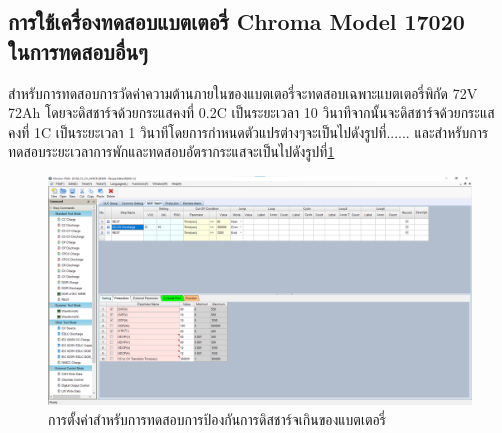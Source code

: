 \subsection{การใช้เครื่องทดสอบแบตเตอรี่ Chroma Model 17020 \\ ในการทดสอบอื่นๆ}
สำหรับการทดสอบการวัดค่าความต้านภายในของแบตเตอรี่จะทดสอบเฉพาะแบตเตอรี่พิกัด 72V 72Ah โดยจะดิสชาร์จด้วยกระแสคงที่ 0.2C เป็นระยะเวลา 10 วินาทีจากนั้นจะดิสชาร์จด้วยกระแสคงที่ 
1C เป็นระยะเวลา 1 วินาทีโดยการกำหนดตัวแปรต่างๆจะเป็นไปดังรูปที่...... และสำหรับการทดสอบระยะเวลาการพักและทดสอบอัตรากระแสจะเป็นไปดังรูปที่\ref{fig:setting_rest}
\begin{center}
	\begin{figure}[H]
		\includegraphics[width=1\linewidth]{Chapters/img/R136_DEMO/UUT_TEST_OVDCP.png}
		\centering
		\captionsetup{justification=centering,margin=2cm}
		\caption{การตั้งค่าสำหรับการทดสอบการป้องกันการดิสชาร์จเกินของแบตเตอรี่}
		\label{fig:setting_rest}
	\end{figure}
\end{center}
















